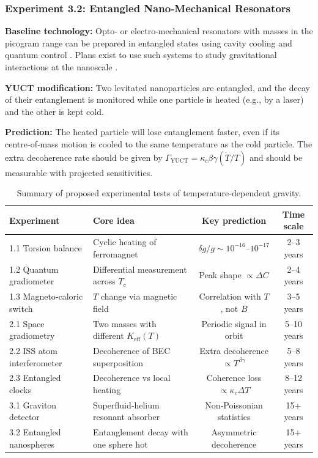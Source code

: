 \documentclass[12pt]{article}
\theoremstyle{remark}
\newcommand{\Keff}{K_{\mathrm{eff}}}
\begin{document}
	\subsubsection{Experiment 3.2: Entangled Nano‑Mechanical Resonators}
	
	\textbf{Baseline technology:} Opto‑ or electro‑mechanical resonators with masses in the picogram range can be
	prepared in entangled states using cavity cooling and quantum control \cite{Aspelmeyer2014}.  
	Plans exist to use such systems to study gravitational interactions at the nanoscale \cite{Geraci2010}.
	
	\textbf{YUCT modification:} Two levitated nanoparticles are entangled, and the decay of their entanglement is
	monitored while one particle is heated (e.g., by a laser) and the other is kept cold.
	
	\textbf{Prediction:} The heated particle will lose entanglement faster, even if its centre‑of‑mass motion is
	cooled to the same temperature as the cold particle.  
	The extra decoherence rate should be given by \(\Gamma_{\mathrm{YUCT}} = \kappa_c \beta\gamma (\dot{T}/T)\) and
	should be measurable with projected sensitivities.
	
	\begin{table}[htbp]
		\centering
		\caption{Summary of proposed experimental tests of temperature‑dependent gravity.}
		\label{tab:experiment-summary}
		\small
		\begin{tabularx}{\textwidth}{l X c c}
			\toprule
			\textbf{Experiment} & \textbf{Core idea} & \textbf{Key prediction} & \textbf{Time scale} \\
			\midrule
			1.1 Torsion balance & Cyclic heating of ferromagnet & \(\delta g/g \sim 10^{-16}\)–\(10^{-17}\) & 2–3 years \\
			1.2 Quantum gradiometer & Differential measurement across \(T_c\) & Peak shape \(\propto \Delta C\) & 2–4 years \\
			1.3 Magneto‑caloric switch & \(T\) change via magnetic field & Correlation with \(T\), not \(B\) & 3–5 years \\
			2.1 Space gradiometry & Two masses with different \(\Keff(T)\) & Periodic signal in orbit & 5–10 years \\
			2.2 ISS atom interferometer & Decoherence of BEC superposition & Extra decoherence \(\propto T^{\beta\gamma}\) & 5–8 years \\
			2.3 Entangled clocks & Decoherence vs local heating & Coherence loss \(\propto \kappa_c \Delta T\) & 8–12 years \\
			3.1 Graviton detector & Superfluid‑helium resonant absorber & Non‑Poissonian statistics & 15+ years \\
			3.2 Entangled nanospheres & Entanglement decay with one sphere hot & Asymmetric decoherence & 15+ years \\
			\bottomrule
		\end{tabularx}
	\end{table}
	
\end{document}
